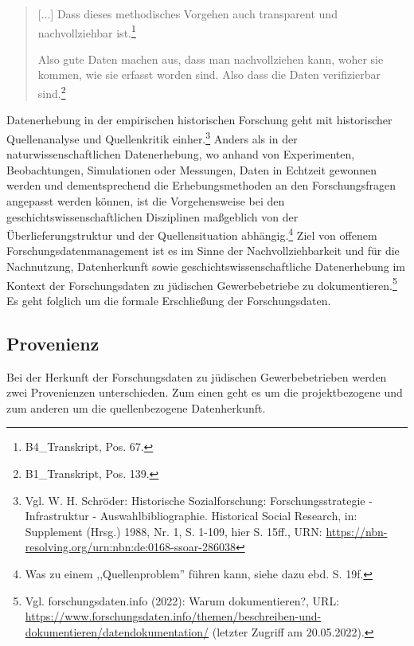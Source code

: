 \begin{quote}
    [...] Dass dieses methodisches Vorgehen auch transparent und nachvollziehbar ist.\footnote{B4\_Transkript, Pos. 67.}

    Also gute Daten machen aus, dass man nachvollziehen kann, woher sie kommen, wie sie erfasst worden sind. Also dass die Daten verifizierbar sind.\footnote{B1\_Transkript, Pos. 139.}
\end{quote}

Datenerhebung in der empirischen historischen Forschung geht mit historischer Quellenanalyse und Quellenkritik einher.\footnote{Vgl. W. H. Schröder: Historische Sozialforschung: Forschungsstrategie - Infrastruktur - Auswahlbibliographie.
Historical Social Research, in: Supplement (Hrsg.) 1988, Nr. 1, S. 1-109, hier S. 15ff., URN: \url{https://nbn-resolving.org/urn:nbn:de:0168-ssoar-286038}
} Anders als in der naturwissenschaftlichen Datenerhebung, wo anhand von Experimenten, Beobachtungen, Simulationen oder Messungen, Daten in Echtzeit gewonnen werden und dementsprechend die Erhebungsmethoden an den Forschungsfragen angepasst werden können, ist die Vorgehensweise bei den geschichtswissenschaftlichen Disziplinen maßgeblich von der Überlieferungstruktur und der Quellensituation abhängig.\footnote{Was zu einem ,,Quellenproblem'' führen kann, siehe dazu ebd. S. 19f.} Ziel von offenem Forschungsdatenmanagement ist es im Sinne der Nachvollziehbarkeit und für die Nachnutzung, Datenherkunft sowie geschichtswissenschaftliche Datenerhebung im Kontext der Forschungsdaten zu jüdischen Gewerbebetriebe zu dokumentieren.\footnote{Vgl. forschungsdaten.info (2022): Warum dokumentieren?, URL: \url{https://www.forschungsdaten.info/themen/beschreiben-und-dokumentieren/datendokumentation/} (letzter Zugriff am 20.05.2022).} Es geht folglich um die formale Erschließung der Forschungsdaten.

\subsection{Provenienz}

Bei der Herkunft der Forschungsdaten zu jüdischen Gewerbebetrieben werden zwei Provenienzen unterschieden. Zum einen geht es um die projektbezogene und zum anderen um die quellenbezogene Datenherkunft.  

